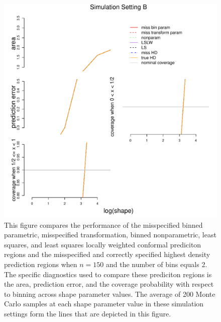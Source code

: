 \documentclass[11pt]{article}\usepackage[]{graphicx}\usepackage[]{color}
\makeatletter
\def\maxwidth{ %
  \ifdim\Gin@nat@width>\linewidth
    \linewidth
  \else
    \Gin@nat@width
  \fi
}
\newenvironment{knitrout}{}{} %
\makeatother
\begin{document}
\newpage
\begin{figure}[h!]
\begin{center}
\begin{knitrout}
\color{fgcolor}
\includegraphics[width=\maxwidth]{figure/Fig-misspec-150-1} 

\end{knitrout}
\end{center}
\caption{This figure compares the performance of the 
  misspecified binned parametric,
  misspecified transformation,  
  binned nonparametric,
  least squares, and 
  least squares locally weighted conformal prediciton regions and the 
  misspecified and correctly specified highest density prediction regions 
  when $n = 150$ and the number of bins equals 2.  
  The specific diagnostics used to compare these prediciton regions is the 
    area,
    prediction error, and
    the coverage probability with respect to binning  
    across shape parameter values.
  The average of 200 Monte Carlo samples at each shape parameter value in 
  these simulation settings form the lines that are depicted in this figure.}
\label{Fig:misspec.150}
\end{figure}
\end{document}
